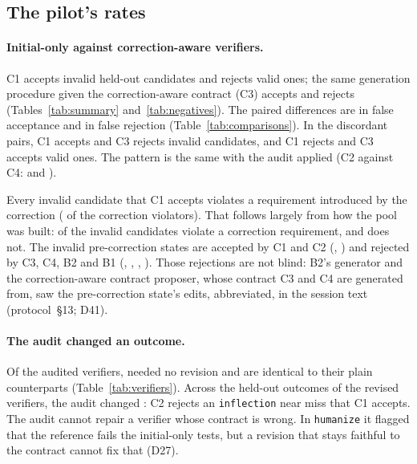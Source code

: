 \subsection{The pilot's rates}
\paragraph{Initial-only against correction-aware verifiers.} C1 accepts  invalid held-out candidates and
rejects  valid ones; the same generation procedure given the correction-aware contract (C3) accepts
 and rejects  (Tables~\ref{tab:summary} and~\ref{tab:negatives}). The paired differences are
 in false acceptance and  in false rejection
(Table~\ref{tab:comparisons}). In the discordant pairs, C1 accepts and C3 rejects  invalid
candidates, and C1 rejects and C3 accepts  valid ones. The pattern is the same with the audit
applied (C2 against C4:  and ).

Every invalid candidate that C1 accepts violates a requirement introduced by the correction ( of the
correction violators). That follows largely from how the pool was built:  of the 
invalid candidates violate a correction requirement, and  does not. The  invalid
pre-correction states are accepted by C1 and C2 (, ) and rejected by C3, C4, B2 and B1
(, , , ). Those rejections are not blind: B2's generator and the
correction-aware contract proposer, whose contract C3 and C4 are generated from, saw the pre-correction state's edits,
abbreviated, in the session text (protocol~\S13; D41).

\paragraph{The audit changed an outcome.} Of the  audited verifiers, 
needed no revision and are identical to their plain counterparts (Table~\ref{tab:verifiers}). Across the
 held-out outcomes of the  revised verifiers, the audit changed
: C2 rejects an \texttt{inflection} near miss that C1 accepts. The audit cannot repair a verifier
whose contract is wrong. In \texttt{humanize} it flagged that the reference fails the initial-only tests, but a revision
that stays faithful to the contract cannot fix that (D27).

